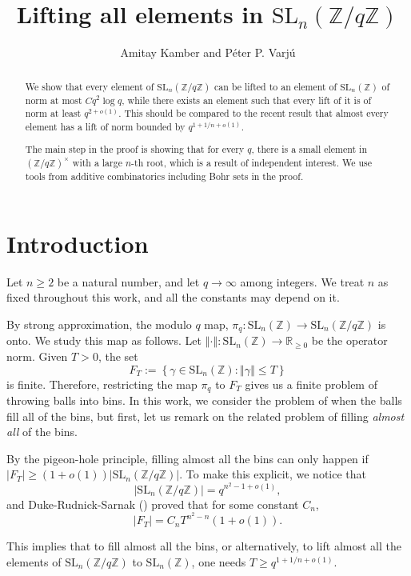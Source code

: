 \documentclass[12pt, a4paper]{amsart}
\title{Lifting all elements in $\mathrm{SL}_n(\mathbb{Z}/q\mathbb{Z})$}
\author{Amitay Kamber and P\'eter P. Varj\'u}
\numberwithin{equation}{section}
\theoremstyle{definition}
\newcommand{\R}{\mathbb{R}}
\newcommand{\Z}{\mathbb{Z}}
\newcommand{\SL}{\mathrm{SL}}
\newcommand{\n}[1]{\left\Vert #1\right\Vert }
\begin{document}
\begin{abstract}
We show that every element of $\mathrm{SL}_{n}(\mathbb{Z}/q\mathbb{Z})$ can be lifted to an element of $\mathrm{SL}_{n}(\mathbb{Z})$ of norm at most $Cq^2\log q$, while there exists an element such that every lift of it is of norm at least $q^{2+o(1)}$. This should be compared to the recent result that almost every element has a lift of norm bounded by $q^{1+1/n+o(1)}$.

The main step in the proof is showing that for every $q$, there is a small element in $(\mathbb{Z}/q\mathbb{Z})^\times$ with a large $n$-th root, which is a result of independent interest.
We use tools from additive combinatorics including Bohr sets
in the proof.
\end{abstract}
\maketitle

\section{Introduction}

Let $n\ge2$ be a natural number, and let $q\to\infty$ among integers. We treat $n$ as fixed throughout this work, and all the constants may depend on it.

By strong approximation, the modulo $q$ map, $\pi_{q}\colon\SL_{n}(\Z)\to\SL_{n}(\Z/q\Z)$ is onto. We study this map as follows. Let $\n{\cdot}\colon\SL_{n}(\Z)\to\R_{\ge0}$ be the operator norm. Given $T>0$, the set 
\[
F_T:=\left\{ \gamma\in\SL_{n}(\Z):\n{\gamma}\le T\right\}
\]
is finite. Therefore, restricting the map $\pi_q$ to $F_T$ gives us a finite problem of throwing balls into bins.
In this work, we consider the problem of when the balls fill all of the bins, but first, let us remark on the related problem of filling \emph{almost all} of the bins.

By the pigeon-hole principle, filling almost all the bins can only happen if $|F_T| \ge (1+o(1))|\SL_n(\Z/q\Z)|$. To make this explicit, we notice that 
\[
|\SL_n(\Z/q\Z)|=q^{n^2-1+o(1)},
\]
and Duke-Rudnick-Sarnak (\cite[Example 1.6]{duke1993density}) proved that for some constant $C_n$,
\begin{equation}\label{eq:DRS}
|F_T| =C_{n}T^{n^{2}-n}(1+o(1)).    
\end{equation}

This implies that to fill almost all the bins, or alternatively, to lift almost all the elements of $\SL_n(\Z/q\Z)$ to $\SL_n(\Z)$, one needs $T\ge q^{1+1/n+o(1)}$. 
\end{document}
